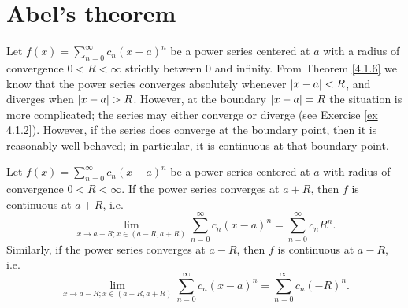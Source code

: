 \section{Abel's theorem}\label{sec 4.3}

\begin{note}
    Let \(f(x) = \sum_{n = 0}^\infty c_n (x - a)^n\) be a power series centered at \(a\) with a radius of convergence \(0 < R < \infty\) strictly between \(0\) and infinity.
    From Theorem \ref{4.1.6} we know that the power series converges absolutely whenever \(\left\lvert x - a\right\rvert < R\), and diverges when \(\left\lvert x - a\right\rvert > R\).
    However, at the boundary \(\left\lvert x - a\right\rvert = R\) the situation is more complicated;
    the series may either converge or diverge (see Exercise \ref{ex 4.1.2}).
    However, if the series does converge at the boundary point, then it is reasonably well behaved;
    in particular, it is continuous at that boundary point.
\end{note}

\begin{theorem}\label{4.3.1}
    Let \(f(x) = \sum_{n = 0}^\infty c_n (x - a)^n\) be a power series centered at \(a\) with radius of convergence \(0 < R < \infty\).
    If the power series converges at \(a + R\), then \(f\) is continuous at \(a + R\), i.e.
    \[
        \lim_{x \to a + R ; x \in (a - R, a + R)} \sum_{n = 0}^\infty c_n (x - a)^n = \sum_{n = 0}^\infty c_n R^n.
    \]
    Similarly, if the power series converges at \(a - R\), then \(f\) is continuous at \(a - R\), i.e.
    \[
        \lim_{x \to a - R ; x \in (a - R, a + R)} \sum_{n = 0}^\infty c_n (x - a)^n = \sum_{n = 0}^\infty c_n (-R)^n.
    \]
\end{theorem}

